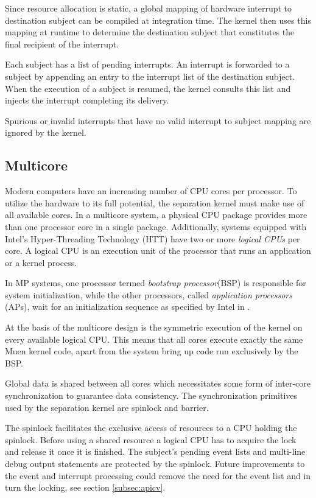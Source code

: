 Since resource allocation is static, a global mapping of hardware interrupt to
destination subject can be compiled at integration time. The kernel then uses
this mapping at runtime to determine the destination subject that constitutes
the final recipient of the interrupt.

Each subject has a list of pending interrupts. An interrupt is forwarded to a
subject by appending an entry to the interrupt list of the destination subject.
When the execution of a subject is resumed, the kernel consults this list and
injects the interrupt completing its delivery.

Spurious or invalid interrupts that have no valid interrupt to subject mapping
are ignored by the kernel.

\subsection{Multicore}\label{subsec:multicore}
Modern computers have an increasing number of CPU cores per processor. To
utilize the hardware to its full potential, the separation kernel must make use
of all available cores. In a multicore system, a physical CPU
package provides more than one processor core in a single package.
Additionally, systems equipped with Intel's Hyper-Threading Technology
(HTT) have two or more \emph{logical CPUs} per core. A logical CPU
is an execution unit of the processor that runs an application or a kernel
process.

In MP systems, one processor termed \emph{bootstrap processor}(BSP) is responsible for system initialization, while the other
processors, called \emph{application processors}
(APs), wait for an initialization sequence as specified by Intel in
\cite{intel:mp}.

At the basis of the multicore design is the symmetric execution of the kernel on
every available logical CPU. This means that all cores execute exactly the same
Muen kernel code, apart from the system bring up code run exclusively by the
BSP.

Global data is shared between all cores which necessitates some form of
inter-core synchronization to guarantee data
consistency. The synchronization primitives used by the separation kernel are
spinlock and barrier.

The spinlock facilitates the exclusive access of resources to a
CPU holding the spinlock. Before using a shared resource a logical CPU has to
acquire the lock and release it once it is finished. The subject's pending
event lists and multi-line debug output statements are protected by the
spinlock. Future improvements to the event and interrupt processing could
remove the need for the event list and in turn the locking, see section
\ref{subsec:apicv}.

